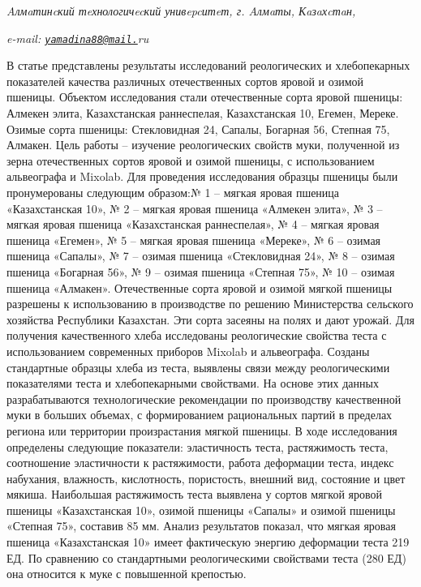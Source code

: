 \begin{affiliation}
\emph{Aлмaтинcкий тeхнологичecкий унивepcитeт, г. Aлмaты, Кaзaхcтaн,}

\emph{e-mail: \href{mailto:yamadina88@mail.}{\nolinkurl{yamadina88@mail.}}ru}
\end{affiliation}

В статье представлены результаты исследований реологических и
хлебопекарных показателей качества различных отечественных сортов яровой
и озимой пшеницы. Объектом исследования стали отечественные сорта яровой
пшеницы: Алмекен элита, Казахстанская раннеспелая, Казахстанская 10,
Егемен, Мереке. Озимые сорта пшеницы: Стекловидная 24, Сапалы, Богарная
56, Степная 75, Алмакен. Цель работы -- изучение реологических свойств
муки, полученной из зерна отечественных сортов яровой и озимой пшеницы,
с использованием альвеографа и Mixolab. Для проведения исследования
образцы пшеницы были пронумерованы следующим образом:№ 1 -- мягкая
яровая пшеница «Казахстанская 10», № 2 -- мягкая яровая пшеница «Алмекен
элита», № 3 -- мягкая яровая пшеница «Казахстанская раннеспелая», № 4 --
мягкая яровая пшеница «Егемен», № 5 -- мягкая яровая пшеница «Мереке», №
6 -- озимая пшеница «Сапалы», № 7 -- озимая пшеница «Стекловидная 24», №
8 -- озимая пшеница «Богарная 56», № 9 -- озимая пшеница «Степная 75», №
10 -- озимая пшеница «Алмакен». Отечественные сорта яровой и озимой
мягкой пшеницы разрешены к использованию в производстве по решению
Министерства сельского хозяйства Республики Казахстан. Эти сорта засеяны
на полях и дают урожай. Для получения качественного хлеба исследованы
реологические свойства теста с использованием современных приборов
Mixolab и альвеографа. Созданы стандартные образцы хлеба из теста,
выявлены связи между реологическими показателями теста и хлебопекарными
свойствами. На основе этих данных разрабатываются технологические
рекомендации по производству качественной муки в больших объемах, с
формированием рациональных партий в пределах региона или территории
произрастания мягкой пшеницы. В ходе исследования определены следующие
показатели: эластичность теста, растяжимость теста, соотношение
эластичности к растяжимости, работа деформации теста, индекс набухания,
влажность, кислотность, пористость, внешний вид, состояние и цвет
мякиша. Наибольшая растяжимость теста выявлена у сортов мягкой яровой
пшеницы «Казахстанская 10», озимой пшеницы «Сапалы» и озимой пшеницы
«Степная 75», составив 85 мм. Анализ результатов показал, что мягкая
яровая пшеница «Казахстанская 10» имеет фактическую энергию деформации
теста 219 ЕД. По сравнению со стандартными реологическими свойствами
теста (280 ЕД) она относится к муке с повышенной крепостью.

